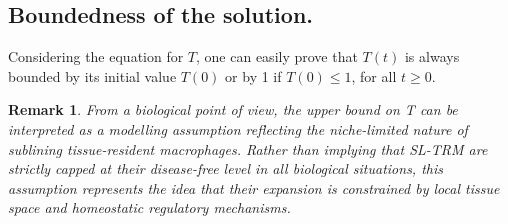 \documentclass[a4paper, 12pt]{article}
\newtheorem{rem}{Remark}[section]
\begin{document}
\subsection{Boundedness of the solution.}
Considering the equation for $T$, one can easily prove that $T(t)$  is always bounded by its initial value $T(0)$ or by 1 if $T(0) \leq 1$, for all $t \geq 0$. 
\begin{rem}%
From a biological point of view, the upper bound on T can be interpreted as a modelling assumption reflecting the niche-limited nature of sublining tissue-resident macrophages. Rather than implying that SL-TRM are strictly capped at their disease-free level in all biological situations, this assumption represents the idea that their expansion is constrained by local tissue space and homeostatic regulatory mechanisms.
\end{rem}
\end{document}
